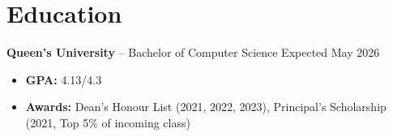 

\section*{Education}
\textbf{Queen's University} -- Bachelor of Computer Science \hfill Expected May 2026 \\
\vspace{-5pt}
\begin{itemize}
  \item \textbf{GPA:} 4.13/4.3
  \item \textbf{Awards:} Dean's Honour List (2021, 2022, 2023), Principal's Scholarship (2021, Top 5\% of incoming class)
\end{itemize}

